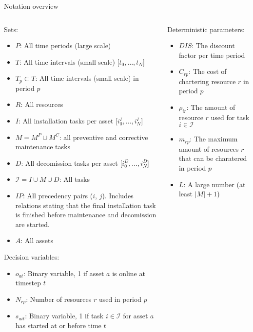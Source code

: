 \documentclass{beamer}
\begin{document}
\begin{frame}{Notation overview}
\tiny

\begin{columns}
\begin{column}{.48\textwidth}
Sets:
\begin{itemize}
\item $P$: All time periods (large scale)
\item $T$: All time intervals (small scale) [$t_0, \dots , t_N$]
\item $T_p \subset T$: All time intervals (small scale) in period $p$
\item $R$: All resources
\item $I$: All installation tasks per asset [$i^I_0, \dots , i^I_N$]
\item $M = M^P \cup M^C$: all preventive and corrective maintenance tasks
\item $D$: All decomission tasks per asset [$i^D_0, \dots , i^D_N$]
\item $\mathcal{I} = I \cup M \cup D$: All tasks
\item $IP$: All precedency pairs ($i$, $j$). Includes relations stating that the final installation task is finished before maintenance and decomission are started. 
\item $A$: All assets
\end{itemize}

Decision variables:
\begin{itemize}
\item $o_{at}$: Binary variable, 1 if asset $a$ is online at timestep $t$
\item $N_{rp}$: Number of resources $r$ used in period $p$
\item $s_{ait}$: Binary variable, 1 if task $i \in \mathcal{I}$ for asset $a$ has started at or before time $t$
\end{itemize}
\end{column}

\hfill

\begin{column}{.48\textwidth}
Deterministic parameters:
\begin{itemize}
\item $DIS$: The discount factor per time period
\item $C_{rp}$: The cost of chartering resource $r$ in period $p$
\item $\rho_{ir}$: The amount of resource $r$ used for task $i \in \mathcal{I}$
\item $m_{rp}$: The maximum amount of resources $r$ that can be charatered in period $p$
\item $L$: A large number (at least $|M|+1$)
\end{itemize}


\end{column}
\end{columns}
\end{frame}
\end{document}
